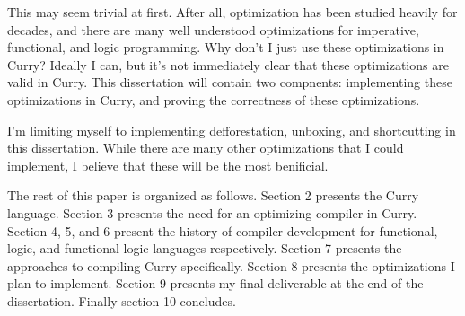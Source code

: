 This may seem trivial at first.  After all, optimization has been studied heavily for decades, and there are many well understood
optimizations for imperative, functional, and logic programming. 
\cite{optminzation_allen, dataflow_allen, LowryMedlock69, dataflow_kildall,
AhoUllman77, continuations_appel, compilers_appel, orbit, ssa_alpern, ssa_Wegman, ssa_wolfe,
steele78, stg-peytonJones, anormal_Flanagan, lambda_rename_steel, lambda_goto,
deforestation_wadler, shortcut_deforestation, haskell_inliner}
Why don't I just use these optimizations in Curry?
Ideally I can, but it's not immediately clear that these optimizations are valid in Curry.
This dissertation will contain two compnents: implementing these optimizations in Curry,
and proving the correctness of these optimizations.

I'm limiting myself to implementing defforestation, unboxing, and shortcutting in this dissertation.
While there are many other optimizations that I could implement, I believe that these will be the most benificial.

The rest of this paper is organized as follows.
Section 2 presents the Curry language. Section 3 presents the need for an optimizing compiler in Curry.
Section 4, 5, and 6 present the history of compiler development for functional, logic, and functional logic languages respectively.
Section 7 presents the approaches to compiling Curry specifically.
Section 8 presents the optimizations I plan to implement.
Section 9 presents my final deliverable at the end of the dissertation.
Finally section 10 concludes.
